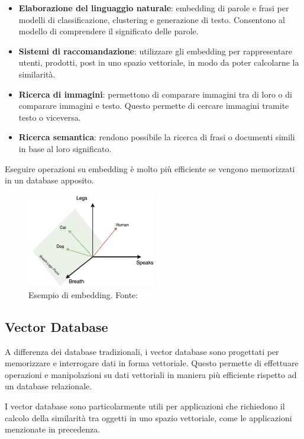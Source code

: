 \begin{itemize}
  \item \textbf{Elaborazione del linguaggio naturale}: embedding
        di parole e frasi per modelli di classificazione,
        clustering e generazione di testo.
        Consentono al modello di comprendere il significato delle
        parole.
  \item \textbf{Sistemi di raccomandazione}: utilizzare gli
        embedding per rappresentare utenti, prodotti, post in uno
        spazio vettoriale, in modo da poter calcolarne la similarità.
  \item \textbf{Ricerca di immagini}: permettono di comparare
        immagini tra di loro o di comparare immagini e testo.
        Questo permette di cercare immagini tramite testo o
        viceversa.
  \item \textbf{Ricerca semantica}: rendono possibile la ricerca di
        frasi o documenti simili in base al loro significato.
\end{itemize}

Eseguire operazioni su embedding è molto più efficiente se
vengono memorizzati in un database apposito.

\begin{figure}[H]
  \centering
  \includegraphics[width=0.5\textwidth]{res/embedding_space.png}
  \caption{Esempio di embedding. Fonte: \cite{mikolov2013efficient}}
  \label{fig:embedding-example}
\end{figure}

\subsection{Vector Database}
\label{sec:vector-database}
A differenza dei database tradizionali, i vector database
sono progettati per memorizzare e interrogare dati in forma
vettoriale.
Questo permette di effettuare operazioni e manipolazioni su
dati vettoriali in maniera più efficiente rispetto ad un
database relazionale.

I vector database sono particolarmente utili per
applicazioni che richiedono il calcolo della similarità tra
oggetti in uno spazio vettoriale, come le applicazioni
menzionate in precedenza.

